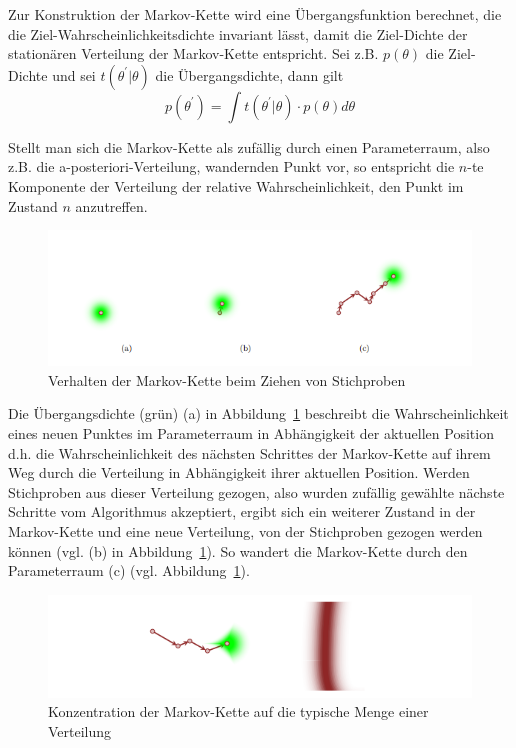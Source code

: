 \documentclass[ngerman]{ttlab-qualify}
\begin{document}
Zur Konstruktion der Markov-Kette wird eine Übergangsfunktion berechnet, die die Ziel-Wahrscheinlichkeitsdichte invariant lässt, damit die Ziel-Dichte der stationären Verteilung der Markov-Kette entspricht. 
Sei z.B. $p(\theta)$ die Ziel-Dichte und sei $t(\theta^{'}|\theta)$ die Übergangsdichte, dann gilt
\[p(\theta^{'}) =\int t(\theta^{'}|\theta)\cdot p(\theta) d\theta \]

Stellt man sich die Markov-Kette als zufällig durch einen Parameterraum, also z.B. die a-posteriori-Verteilung, wandernden Punkt vor, so entspricht die $n$-te Komponente der Verteilung der relative Wahrscheinlichkeit, den Punkt im Zustand $n$ anzutreffen. 
\begin{figure}[h]
\begin{center}
\includegraphics[scale=.9]{images/markov-chain-plain-betancourt-2017}
\caption{Verhalten der Markov-Kette beim Ziehen von Stichproben \parencite{betancourt:2017}}
\label{fig:markov-chain-plain}
\end{center}
\end{figure}

Die Übergangsdichte (grün) (a) in Abbildung~\ref{fig:markov-chain-plain} beschreibt die Wahrscheinlichkeit eines neuen Punktes im Parameterraum in Abhängigkeit der aktuellen Position d.h. die Wahrscheinlichkeit des nächsten Schrittes der Markov-Kette auf ihrem Weg durch die Verteilung in Abhängigkeit ihrer aktuellen Position.  Werden Stichproben aus dieser Verteilung gezogen, also wurden zufällig gewählte nächste Schritte vom Algorithmus akzeptiert, ergibt sich ein weiterer Zustand in der Markov-Kette und eine neue Verteilung, von der Stichproben gezogen werden können (vgl. (b) in Abbildung~\ref{fig:markov-chain-plain}). So wandert die Markov-Kette durch den Parameterraum (c) (vgl. Abbildung~\ref{fig:markov-chain-plain}).

\begin{figure}[H]
\begin{center}
\includegraphics[scale=.9]{images/markov-chain-target-betancourt-2017}
\caption{Konzentration der Markov-Kette auf die typische Menge einer Verteilung \parencite{betancourt:2017}}
\label{fig:markov-chain-target}
\end{center}
\end{figure}
\end{document}
